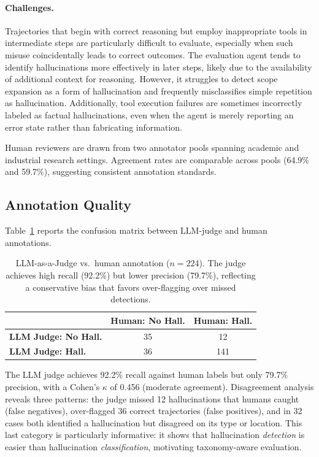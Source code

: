\documentclass{article}
\begin{document}
\paragraph{Challenges.}
Trajectories that begin with correct reasoning but employ inappropriate tools in intermediate steps are particularly difficult to evaluate, especially when such misuse coincidentally leads to correct outcomes. The evaluation agent tends to identify hallucinations more effectively in later steps, likely due to the availability of additional context for reasoning. However, it struggles to detect scope expansion as a form of hallucination and frequently misclassifies simple repetition as hallucination. Additionally, tool execution failures are sometimes incorrectly labeled as factual hallucinations, even when the agent is merely reporting an error state rather than fabricating information.

Human reviewers are drawn from two annotator pools spanning academic and industrial research settings. Agreement rates are comparable across pools (64.9\% and 59.7\%), suggesting consistent annotation standards.

\subsection{Annotation Quality}
\label{app:annotation_quality}

Table~\ref{tab:confusion} reports the confusion matrix between LLM-judge and human annotations.

\begin{table}[t]
\caption{LLM-as-a-Judge vs.\ human annotation ($n = 224$). The judge achieves high recall (92.2\%) but lower precision (79.7\%), reflecting a conservative bias that favors over-flagging over missed detections.}
\label{tab:confusion}
\centering
\small
\begin{tabular}{lcc}
\toprule
 & \textbf{Human: No Hall.} & \textbf{Human: Hall.} \\
\midrule
\textbf{LLM Judge: No Hall.} & 35 & 12 \\
\textbf{LLM Judge: Hall.}    & 36 & 141 \\
\bottomrule
\end{tabular}
\end{table}

The LLM judge achieves 92.2\% recall against human labels but only 79.7\% precision, with a Cohen's $\kappa$ of 0.456 (moderate agreement). Disagreement analysis reveals three patterns: the judge missed 12 hallucinations that humans caught (false negatives), over-flagged 36 correct trajectories (false positives), and in 32 cases both identified a hallucination but disagreed on its type or location. This last category is particularly informative: it shows that hallucination \emph{detection} is easier than hallucination \emph{classification}, motivating taxonomy-aware evaluation.
\end{document}
